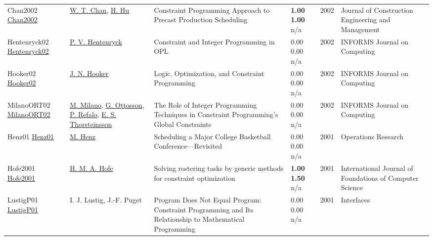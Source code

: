 {\begin{longtable}{p{3cm}p{5cm}p{10cm}p{1cm}rp{2.5cm}l}
Chan2002 \href{http://dx.doi.org/10.1061/(asce)0733-9364(2002)128:6(513)}{Chan2002} & \hyperref[auth:a1660]{W. T. Chan}, \hyperref[auth:a1661]{H. Hu} & Constraint Programming Approach to Precast Production Scheduling & \noindent{}\textbf{1.00} \textbf{1.00} n/a & 2002 & Journal of Construction Engineering and Management & \cite{Chan2002}\\
Hentenryck02 \href{http://dx.doi.org/10.1287/ijoc.14.4.345.2826}{Hentenryck02} & \hyperref[auth:a148]{P. V. Hentenryck} & Constraint and Integer Programming in OPL & \noindent{}\textcolor{black!50}{0.00} \textcolor{black!50}{0.00} n/a & 2002 & \cellcolor{red!20}INFORMS Journal on Computing & \cite{Hentenryck02}\\
Hooker02 \href{http://dx.doi.org/10.1287/ijoc.14.4.295.2828}{Hooker02} & \hyperref[auth:a160]{J. N. Hooker} & Logic, Optimization, and Constraint Programming & \noindent{}\textcolor{black!50}{0.00} \textcolor{black!50}{0.00} n/a & 2002 & \cellcolor{red!20}INFORMS Journal on Computing & \cite{Hooker02}\\
MilanoORT02 \href{http://dx.doi.org/10.1287/ijoc.14.4.387.2830}{MilanoORT02} & \hyperref[auth:a143]{M. Milano}, \hyperref[auth:a851]{G. Ottosson}, \hyperref[auth:a254]{P. Refalo}, \hyperref[auth:a873]{E. S. Thorsteinsson} & The Role of Integer Programming Techniques in Constraint Programming's Global Constraints & \noindent{}\textcolor{black!50}{0.00} \textcolor{black!50}{0.00} n/a & 2002 & \cellcolor{red!20}INFORMS Journal on Computing & \cite{MilanoORT02}\\
Henz01 \href{http://dx.doi.org/10.1287/opre.49.1.163.11193}{Henz01} & \hyperref[auth:a1418]{M. Henz} & Scheduling a Major College Basketball Conference—Revisited & \noindent{}\textcolor{black!50}{0.00} \textcolor{black!50}{0.00} n/a & 2001 & \cellcolor{red!20}Operations Research & \cite{Henz01}\\
Hofe2001 \href{http://dx.doi.org/10.1142/s0129054101000710}{Hofe2001} & \hyperref[auth:a2009]{H. M. A. Hofe} & Solving rostering tasks by generic methods for constraint optimization & \noindent{}\textbf{1.00} \textbf{1.50} n/a & 2001 & International Journal of Foundations of Computer Science & \cite{Hofe2001}\\
LustigP01 \href{http://dx.doi.org/10.1287/inte.31.6.29.9647}{LustigP01} & I. J. Lustig, J.-F. Puget & Program Does Not Equal Program: Constraint Programming and Its Relationship to Mathematical Programming & \noindent{}\textcolor{black!50}{0.00} \textcolor{black!50}{0.00} n/a & 2001 & \cellcolor{red!20}Interfaces & \cite{LustigP01}\\

\end{longtable}}
